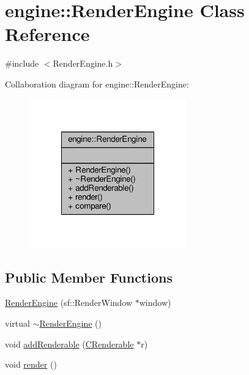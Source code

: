 \hypertarget{classengine_1_1RenderEngine}{\section{engine\-:\-:Render\-Engine Class Reference}
\label{classengine_1_1RenderEngine}
}


{\ttfamily \#include $<$Render\-Engine.\-h$>$}



Collaboration diagram for engine\-:\-:Render\-Engine\-:\nopagebreak
\begin{figure}[H]
\begin{center}
\leavevmode
\includegraphics[width=192pt]{classengine_1_1RenderEngine__coll__graph}
\end{center}
\end{figure}
\subsection*{Public Member Functions}
\begin{DoxyCompactItemize}
\item 
\hyperlink{classengine_1_1RenderEngine_ae6eaf0ab728602a3838dd6dd9e06e2ee}{Render\-Engine} (sf\-::\-Render\-Window $\ast$window)
\item 
virtual \hyperlink{classengine_1_1RenderEngine_af78293a4b6b5bd7e809a17a443f5407a}{$\sim$\-Render\-Engine} ()
\item 
void \hyperlink{classengine_1_1RenderEngine_aa6c7a5b4eb7ed8a4b275a82e5dd7d7ed}{add\-Renderable} (\hyperlink{classengine_1_1CRenderable}{C\-Renderable} $\ast$r)
\item 
void \hyperlink{classengine_1_1RenderEngine_addfadce287630bbabd19ef9c93bd624f}{render} ()
\end{DoxyCompactItemize}
